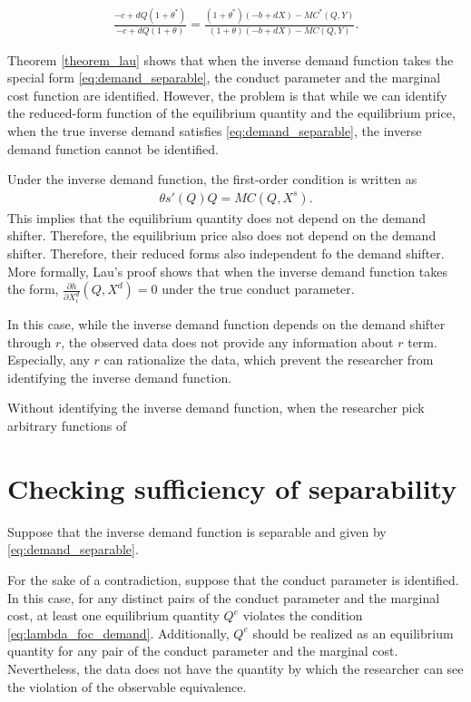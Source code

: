 \documentclass[11pt, a4paper]{article}
\theoremstyle{remark}
\begin{document}
\begin{align}
    \frac{-c+dQ(1+\theta^{*})}{-c+dQ(1+\theta)} = \frac{(1+\theta^{*})(-b +dX) - MC^{*}(Q,Y)}{(1+\theta)(-b +dX) - MC(Q,Y)}.
\end{align}




Theorem \ref{theorem_lau} shows that when the inverse demand function takes the special form \eqref{eq:demand_separable}, the conduct parameter and the marginal cost function are identified.
However, the problem is that while we can identify the reduced-form function of the equilibrium quantity and the equilibrium price, when the true inverse demand satisfies \eqref{eq:demand_separable}, the inverse demand function cannot be identified.

Under the inverse demand function, the first-order condition is written as
\begin{align}
    \theta s'(Q)Q = MC(Q, X^{s}).
\end{align}
This implies that the equilibrium quantity does not depend on the demand shifter.
Therefore, the equilibrium price also does not depend on the demand shifter.
Therefore, their reduced forms also independent fo the demand shifter.
More formally, Lau's proof shows that when the inverse demand function takes the form, $\frac{\partial h}{\partial X_i^{d}}(Q, X^{d}) = 0$ under the true conduct parameter. 





In this case, while the inverse demand function depends on the demand shifter through $r$, the observed data does not provide any information about $r$ term.
Especially, any $r$ can rationalize the data, which prevent the researcher from identifying the inverse demand function.

Without identifying the inverse demand function, when the researcher pick arbitrary functions of 










\section{Checking sufficiency of separability}

Suppose that the inverse demand function is separable and given by \eqref{eq:demand_separable}.

For the sake of a contradiction, suppose that the conduct parameter is identified.
In this case, for any distinct pairs of the conduct parameter and the marginal cost, at least one equilibrium quantity $Q^e$ violates the condition \eqref{eq:lambda_foc_demand}.
Additionally, $Q^e$ should be realized as an equilibrium quantity for any pair of the conduct parameter and the marginal cost.
Nevertheless, the data does not have the quantity by which the researcher can see the violation of the observable equivalence.
\end{document}
